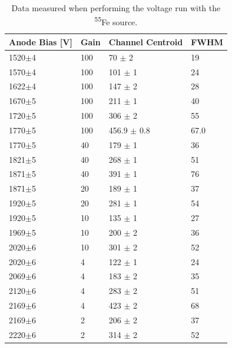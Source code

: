 \documentclass[a4paper, twoside, 11pt]{report}
\begin{document}
\begin{table}[]
\centering
\begin{tabular}{llll}
\hline \hline
Anode Bias {[}V{]} & Gain & Channel Centroid & FWHM \\ \hline
1520$\pm$4               & 100  & 70      $\pm$ 2           & 19   \\
1570$\pm$4               & 100  & 101              $\pm$ 1           & 24   \\
1622$\pm$4               & 100  & 147              $\pm$ 2           & 28   \\
1670$\pm$5               & 100  & 211              $\pm$ 1           & 40   \\
1720$\pm$5               & 100  & 306              $\pm$ 2           & 55   \\
1770$\pm$5               & 100  & 456.9            $\pm$ 0.8         & 67.0 \\
1770$\pm$5               & 40   & 179              $\pm$ 1           & 36   \\
1821$\pm$5               & 40   & 268              $\pm$ 1           & 51   \\
1871$\pm$5               & 40   & 391              $\pm$ 1           & 76   \\
1871$\pm$5               & 20   & 189              $\pm$ 1           & 37   \\
1920$\pm$5               & 20   & 281              $\pm$ 1           & 54   \\
1920$\pm$5               & 10   & 135              $\pm$ 1           & 27   \\
1969$\pm$5               & 10   & 200              $\pm$ 2           & 36   \\
2020$\pm$6               & 10   & 301              $\pm$ 2           & 52   \\
2020$\pm$6               & 4    & 122              $\pm$ 1           & 24   \\
2069$\pm$6               & 4    & 183              $\pm$ 2           & 35   \\
2120$\pm$6               & 4    & 283              $\pm$ 2           & 51   \\
2169$\pm$6               & 4    & 423              $\pm$ 2           & 68   \\
2169$\pm$6               & 2    & 206              $\pm$ 2           & 37   \\
2220$\pm$6               & 2    & 314              $\pm$ 2           & 52  \\ \hline \hline
\end{tabular}
\caption{Data measured when performing the voltage run with the \textsuperscript{55}Fe source.}
\label{tbl:feRun}
\end{table}
\end{document}
